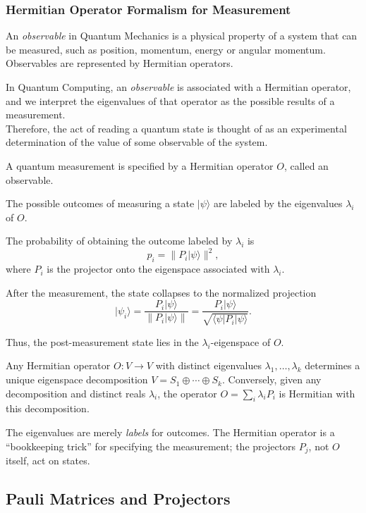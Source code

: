 \documentclass[10pt,a4paper]{article}
\begin{document}
\subsubsection*{Hermitian Operator Formalism for Measurement}
An \textit{observable} in Quantum Mechanics is a physical property of a system that can be measured, such as position, momentum, energy or angular momentum.
Observables are represented by Hermitian operators.

In Quantum Computing, an \textit{observable} is associated with a Hermitian operator, and we interpret the eigenvalues of that operator as the possible results of a measurement.\\
 \hspace*{15pt}Therefore, the act of reading a quantum state is thought of as an experimental determination of the value of some observable of the system.

\begin{tcolorbox}
    [propstyle, title={Postulate}]
 A quantum measurement is specified by a Hermitian operator \(O\), called an observable.

The possible outcomes of measuring a state \(|\psi\rangle\) are labeled by the eigenvalues \(\lambda_i\) of \(O\).

The probability of obtaining the outcome labeled by \(\lambda_i\) is
\[
p_i = \|P_i|\psi\rangle\|^2,
\]
where \(P_i\) is the projector onto the eigenspace associated with \(\lambda_i\).

After the measurement, the state collapses to the normalized projection
\[
|\psi_i\rangle
=
\frac{P_i|\psi\rangle}{\|P_i|\psi\rangle\|}
=
\frac{P_i|\psi\rangle}
{\sqrt{\langle \psi | P_i | \psi \rangle}}.
\]

Thus, the post-measurement state lies in the \(\lambda_i\)-eigenspace of \(O\).
\end{tcolorbox}

Any Hermitian operator $O:V\to V$ with distinct eigenvalues $\lambda_1,\dots,\lambda_k$ determines a unique eigenspace decomposition $V=S_1\oplus\cdots\oplus S_k$. Conversely, given any decomposition and distinct reals $\lambda_i$, the operator $O=\sum_i\lambda_i P_i$ is Hermitian with this decomposition.

The eigenvalues are merely \emph{labels} for outcomes. The Hermitian operator is a ``bookkeeping trick'' for specifying the measurement; the projectors $P_j$, not $O$ itself, act on states.



\subsection{Pauli Matrices and Projectors}
\end{document}
